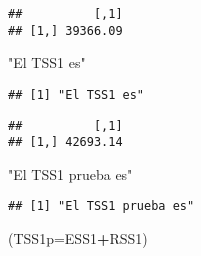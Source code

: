 \documentclass[
]{article}
\newenvironment{Shaded}{\begin{snugshade}}{\end{snugshade}}
\newcommand{\DataTypeTok}[1]{\textcolor[rgb]{0.13,0.29,0.53}{#1}}
\newcommand{\DecValTok}[1]{\textcolor[rgb]{0.00,0.00,0.81}{#1}}
\newcommand{\KeywordTok}[1]{\textcolor[rgb]{0.13,0.29,0.53}{\textbf{#1}}}
\newcommand{\NormalTok}[1]{#1}
\newcommand{\OperatorTok}[1]{\textcolor[rgb]{0.81,0.36,0.00}{\textbf{#1}}}
\newcommand{\StringTok}[1]{\textcolor[rgb]{0.31,0.60,0.02}{#1}}
\begin{document}
\begin{Shaded}
\end{Shaded}

\begin{verbatim}
##          [,1]
## [1,] 39366.09
\end{verbatim}

\begin{Shaded}
\begin{Highlighting}[]
\StringTok{"El TSS1 es"}
\end{Highlighting}
\end{Shaded}

\begin{verbatim}
## [1] "El TSS1 es"
\end{verbatim}

\begin{Shaded}
\end{Shaded}

\begin{verbatim}
##          [,1]
## [1,] 42693.14
\end{verbatim}

\begin{Shaded}
\begin{Highlighting}[]
\StringTok{"El TSS1 prueba es"}
\end{Highlighting}
\end{Shaded}

\begin{verbatim}
## [1] "El TSS1 prueba es"
\end{verbatim}

\begin{Shaded}
\begin{Highlighting}[]
\NormalTok{(}\DataTypeTok{TSS1p=}\NormalTok{ESS1}\OperatorTok{+}\NormalTok{RSS1)}
\end{Highlighting}
\end{Shaded}
\end{document}
